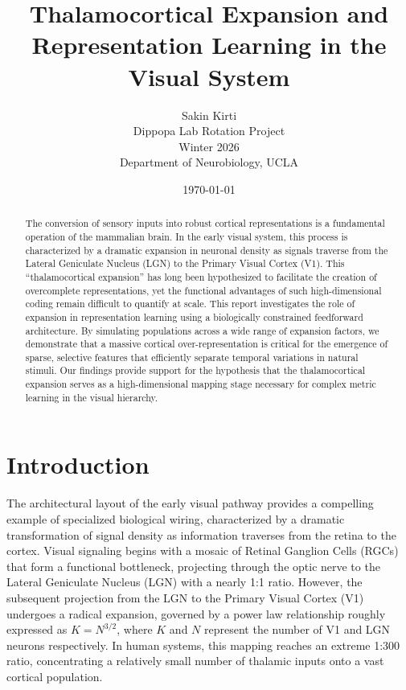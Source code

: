 \documentclass[10pt]{article}
\title{Thalamocortical Expansion and Representation Learning in the Visual System}
\author{Sakin Kirti \\ \small Dippopa Lab Rotation Project \\ \small Winter 2026 \\ \small Department of Neurobiology, UCLA}
\date{\today}
\begin{document}
\maketitle

\begin{abstract}
The conversion of sensory inputs into robust cortical representations is a fundamental operation of the mammalian brain. In the early visual system, this process 
is characterized by a dramatic expansion in neuronal density as signals traverse from the Lateral Geniculate Nucleus (LGN) to the Primary Visual Cortex (V1). 
This ``thalamocortical expansion'' has long been hypothesized to facilitate the creation of overcomplete representations, yet the functional advantages of such 
high-dimensional coding remain difficult to quantify at scale. This report investigates the role of expansion in representation learning using a biologically constrained 
feedforward architecture. By simulating populations across a wide range of expansion factors, we demonstrate that a massive cortical over-representation is critical for 
the emergence of sparse, selective features that efficiently separate temporal variations in natural stimuli. Our findings provide support for the hypothesis that the 
thalamocortical expansion serves as a high-dimensional mapping stage necessary for complex metric learning in the visual hierarchy.
\end{abstract}

\section{Introduction}
The architectural layout of the early visual pathway provides a compelling example of specialized biological wiring, characterized by a dramatic transformation of signal 
density as information traverses from the retina to the cortex. Visual signaling begins with a mosaic of Retinal Ganglion Cells (RGCs) that form a functional bottleneck, 
projecting through the optic nerve to the Lateral Geniculate Nucleus (LGN) with a nearly 1:1 ratio. However, the subsequent projection from the LGN to the Primary Visual 
Cortex (V1) undergoes a radical expansion, governed by a power law relationship roughly expressed as $K=N^{3/2}$, where $K$ and $N$ represent the number of V1 and LGN 
neurons respectively. In human systems, this mapping reaches an extreme 1:300 ratio, concentrating a relatively small number of thalamic inputs onto a vast cortical population.
\end{document}
